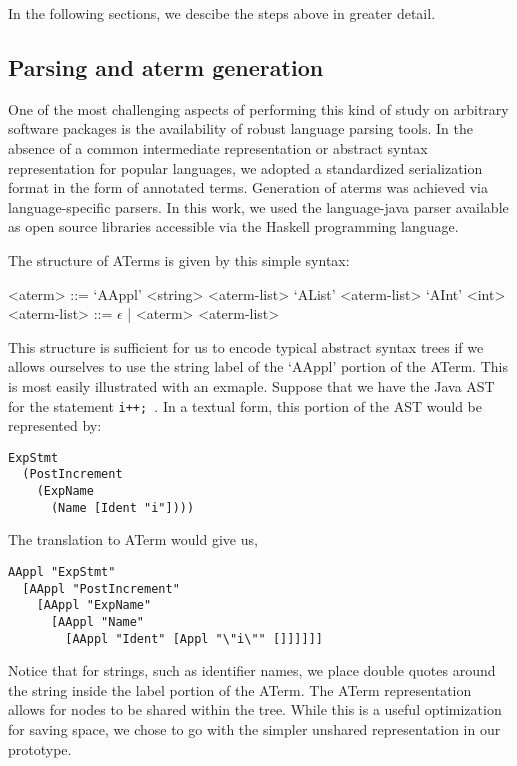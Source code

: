In the following sections, we descibe the steps above in greater detail.

\subsection{Parsing and aterm generation}

One of the most challenging aspects of performing this kind of study on
arbitrary software packages is the availability of robust language parsing
tools.  In the absence of a common intermediate representation or abstract
syntax representation for popular languages, we adopted a standardized
serialization format in the form of annotated terms.  Generation of aterms was
achieved via language-specific parsers.  In this work, we used the
language-java parser available as open source libraries accessible via the
Haskell programming language.

The structure of ATerms is given by this simple syntax:
\begin{grammar}
<aterm> ::= `AAppl' <string> <aterm-list>
\alt `AList' <aterm-list>
\alt `AInt' <int>
<aterm-list> ::= $\epsilon$ | <aterm> <aterm-list>
\end{grammar}

This structure is sufficient for us to encode typical abstract syntax trees if
we allows ourselves to use the string label of the `AAppl' portion of the
ATerm. This is most easily illustrated with an exmaple.  Suppose that we have
the Java AST for the statement {\tt i++; }.  In a textual form, this portion of
the AST would be represented by:

\begin{verbatim}
ExpStmt
  (PostIncrement
    (ExpName
      (Name [Ident "i"])))
\end{verbatim}

The translation to ATerm would give us,

\begin{verbatim}
AAppl "ExpStmt"
  [AAppl "PostIncrement"
    [AAppl "ExpName"
      [AAppl "Name"
        [AAppl "Ident" [Appl "\"i\"" []]]]]]
\end{verbatim}

Notice that for strings, such as identifier names, we place double quotes
around the string inside the label portion of the ATerm. The ATerm
representation allows for nodes to be shared within the tree. While this is a
useful optimization for saving space, we chose to go with the simpler unshared
representation in our prototype.

